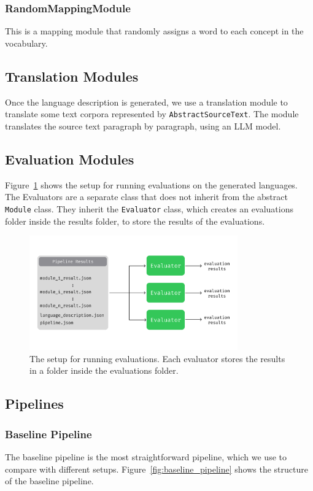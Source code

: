 \subsubsection{RandomMappingModule}
This is a mapping module that randomly assigns a word to each concept in the vocabulary.

\subsection{Translation Modules}
Once the language description is generated, we use a translation module to translate some text corpora represented by \texttt{AbstractSourceText}.
The module translates the source text paragraph by paragraph, using an LLM model.

\subsection{Evaluation Modules}
Figure~\ref{fig:evaluations_structure} shows the setup for running evaluations on the generated languages. The Evaluators are a separate class 
that does not inherit from the abstract \texttt{Module} class. They inherit the \texttt{Evaluator} class, which creates an evaluations folder 
inside the results folder, to store the results of the evaluations. 

\begin{figure}
    \centering
    \includegraphics[width=0.8\textwidth]{figures/evaluations_structure.png}
    \caption{The setup for running evaluations. Each evaluator stores the results in a folder inside the evaluations folder.}
    \label{fig:evaluations_structure}
\end{figure}

\subsection{Pipelines}
\subsubsection{Baseline Pipeline}
 The baseline pipeline is the most straightforward pipeline, which we use to compare with different setups. Figure~\ref{fig:baseline_pipeline} shows the structure of the baseline pipeline.
 

